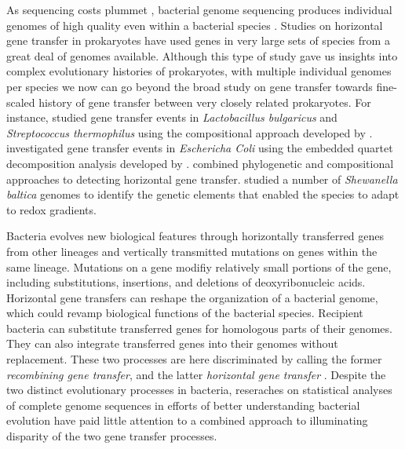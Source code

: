 \documentclass[english]{article}
\begin{document}
As sequencing costs plummet \citep{Mardis2011}, bacterial genome sequencing
produces individual genomes of high quality even within a bacterial species
\citep{Tettelin2009a}.  Studies on horizontal gene transfer in prokaryotes have
used genes in very large sets of species \citep{Koonin2001} from a great deal
of genomes available.  Although this type of study gave us insights into complex
evolutionary histories of prokaryotes, with multiple individual genomes per
species we now can go beyond the broad study on gene transfer towards
fine-scaled history of gene transfer between very closely related prokaryotes.
For instance, \citet{Liu2009} studied gene transfer events in
\textit{Lactobacillus bulgaricus} and \textit{Streptococcus thermophilus} using
the compositional approach developed by \citet{Karlin2001}. \citet{Luo2011}
investigated gene transfer events in \textit{Eschericha Coli} using the embedded
quartet decomposition analysis developed by \citet{Zhaxybayeva2006}.
\citet{Hamady2006} combined phylogenetic and compositional approaches to
detecting horizontal gene transfer.  \citet{Caro-Quintero2011} studied a number
of \textit{Shewanella baltica} genomes to identify the genetic elements that
enabled the species to adapt to redox gradients. 

Bacteria evolves new biological features through horizontally transferred genes
from other lineages and vertically transmitted mutations on genes within
the same lineage.  Mutations on a gene modifiy relatively small portions of the
gene, including substitutions, insertions, and deletions of deoxyribonucleic
acids. Horizontal gene transfers can reshape the organization of a bacterial
genome, which could revamp biological functions of the bacterial species.
Recipient bacteria can substitute transferred genes for homologous parts of
their genomes. They can also integrate transferred genes into their genomes
without replacement. These two processes are here discriminated by calling the
former \textit{recombining gene transfer}, and the latter \textit{horizontal
gene transfer} \citep{Ochman2001,Lawrence2009}.  Despite the two distinct
evolutionary processes in bacteria, reseraches on statistical analyses of
complete genome sequences in efforts of better understanding bacterial evolution
have paid little attention to a combined approach to illuminating disparity of
the two gene transfer processes.
\end{document}
